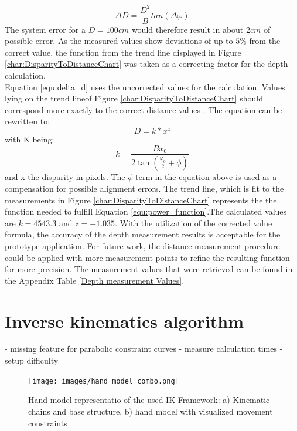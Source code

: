\begin{equation}
\label{equ:delta_d}
\Delta D=\frac{D^{2}}{B} tan(\Delta\varphi)
\end{equation}
The system error for a $D=100cm$ would therefore result in about $2cm$ of possible error.
As the measured values show deviations of up to $5\%$ from the correct value, the function from the trend line displayed in Figure \ref{char:DisparityToDistanceChart} was taken as a correcting factor for the depth calculation.
\\Equation \ref{equ:delta_d} uses the uncorrected values for the calculation. Values lying on the trend lineof Figure \ref{char:DisparityToDistanceChart} should correspond more exactly to the correct distance values \cite{ManafA.Mahammed.2013}. The equation can be rewritten to:
\begin{equation}
\label{equ:power_function}
D=k*x^{z}
\end{equation}
with K being:
\begin{equation}
k=\frac{Bx_0}{2\tan(\frac{\varphi_0}{2}+\phi)}
\end{equation}
and x the disparity in pixels.
The $\phi$ term in the equation above is used as a compensation for possible alignment errors.
The trend line, which is fit to the measurements in Figure \ref{char:DisparityToDistanceChart} represents the the function needed to fulfill Equation \ref{equ:power_function}.The calculated values are $k=4543.3$ and $z=-1.035$.
With the utilization of the corrected value formula, the accuracy of the depth measurement results is acceptable for the prototype application. For future work, the distance measurement procedure could be applied with more measurement points to refine the resulting function for more precision. The measurement values that were retrieved can be found in the Appendix Table \ref{Depth measurement Values}.
\section{Inverse kinematics algorithm}
- missing feature for parabolic constraint curves
- measure calculation times 
- setup difficulty
\begin{figure}[H]
\centering
\texttt{[image: images/hand\_model\_combo.png]}
\caption{Hand model representatio of the used IK Framework: a) Kinematic chains and base structure, b) hand model with visualized movement constraints}
\label{img:netzwerk_diagram} 
\end{figure}

